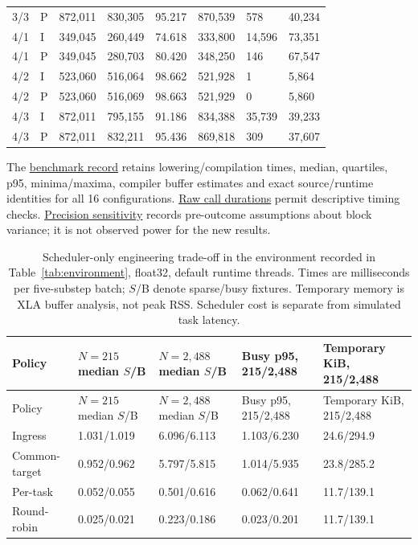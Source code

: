 \documentclass[12pt,a4paper]{article}
\begin{document}
\begin{xltabular}{\textwidth}{@{}YYYYYYYY@{}}
3/3 & P & 872,011 & 830,305 & 95.217 & 870,539 & 578 & 40,234 \\
4/1 & I & 349,045 & 260,449 & 74.618 & 333,800 & 14,596 & 73,351 \\
4/1 & P & 349,045 & 280,703 & 80.420 & 348,250 & 146 & 67,547 \\
4/2 & I & 523,060 & 516,064 & 98.662 & 521,928 & 1 & 5,864 \\
4/2 & P & 523,060 & 516,069 & 98.663 & 521,929 & 0 & 5,860 \\
4/3 & I & 872,011 & 795,155 & 91.186 & 834,388 & 35,739 & 39,233 \\
4/3 & P & 872,011 & 832,211 & 95.436 & 869,818 & 309 & 37,607 \\
\end{xltabular}
\endgroup

The \href{\detokenize{../empirical_extension_2026-09-08/analysis/results/BENCHMARK.json}}{benchmark record} retains lowering/compilation times, median, quartiles, p95, minima/maxima, compiler buffer estimates and exact source/runtime identities for all 16 configurations. \href{\detokenize{../empirical_extension_2026-09-08/analysis/results/BENCHMARK_TIMES.csv}}{Raw call durations} permit descriptive timing checks. \href{\detokenize{../empirical_extension_2026-09-08/confirmation/PRECISION.json}}{Precision sensitivity} records pre-outcome assumptions about block variance; it is not observed power for the new results.

\begingroup
\singlespacing\footnotesize\setlength{\tabcolsep}{3pt}
\renewcommand{\thetable}{D2}
\begin{xltabular}{\textwidth}{@{}YYYYY@{}}
\caption[Scheduler-only engineering trade-offs]{Scheduler-only engineering trade-off in the environment recorded in Table~\ref{tab:environment}, float32, default runtime threads. Times are milliseconds per five-substep batch; $S$/B denote sparse/busy fixtures. Temporary memory is XLA buffer analysis, not peak RSS. Scheduler cost is separate from simulated task latency.}\label{tab:D2} \\
\toprule
Policy & $N=215$ median $S$/B & $N=2{,}488$ median $S$/B & Busy p95, 215/2,488 & Temporary KiB, 215/2,488 \\
\midrule\endfirsthead
\toprule
Policy & $N=215$ median $S$/B & $N=2{,}488$ median $S$/B & Busy p95, 215/2,488 & Temporary KiB, 215/2,488 \\
\midrule\endhead
\bottomrule\endfoot
Ingress & 1.031/1.019 & 6.096/6.113 & 1.103/6.230 & 24.6/294.9 \\
Common-target & 0.952/0.962 & 5.797/5.815 & 1.014/5.935 & 23.8/285.2 \\
Per-task & 0.052/0.055 & 0.501/0.616 & 0.062/0.641 & 11.7/139.1 \\
Round-robin & 0.025/0.021 & 0.223/0.186 & 0.023/0.201 & 11.7/139.1 \\
\end{xltabular}
\endgroup
\end{document}
